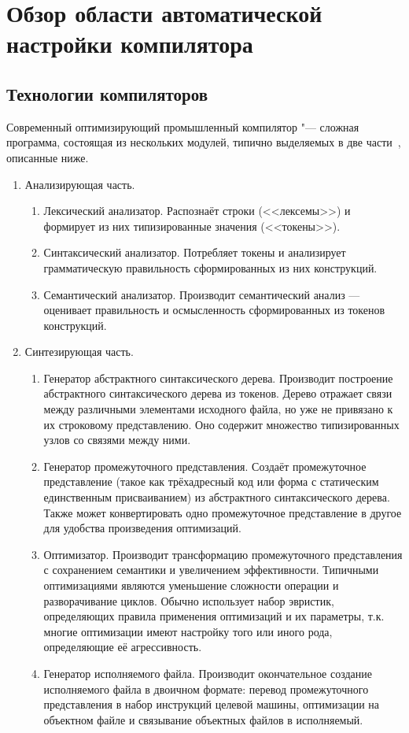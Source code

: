 \section{Обзор области автоматической настройки компилятора}
\subsection{Технологии компиляторов}
Современный оптимизирующий промышленный компилятор "--- сложная программа, состоящая из нескольких модулей, типично выделяемых в две части~\cite{Aho:2006:CPT:1177220}, описанные ниже.
\begin{enumerate}
	\item Анализирующая часть.
	\begin{enumerate}
		\item Лексический анализатор. Распознаёт строки (<<лексемы>>) и формирует из них типизированные значения (<<токены>>).
		\item Синтаксический анализатор. Потребляет токены и анализирует грамматическую правильность сформированных из них конструкций.
		\item Семантический анализатор. Производит семантический анализ --- оценивает правильность и осмысленность сформированных из токенов конструкций.
	\end{enumerate}
	\item Синтезирующая часть.
	\begin{enumerate}
		\item Генератор абстрактного синтаксического дерева. Производит построение абстрактного синтаксического дерева из токенов. Дерево отражает связи между различными элементами исходного файла, но уже не привязано к их строковому представлению. Оно содержит множество типизированных узлов со связями между ними.
		\item Генератор промежуточного представления. Создаёт промежуточное представление (такое как трёхадресный код или форма с статическим единственным присваиванием) из абстрактного синтаксического дерева. Также может конвертировать одно промежуточное представление в другое для удобства произведения оптимизаций.
		\item Оптимизатор. Производит трансформацию промежуточного представления с сохранением семантики и увеличением эффективности. Типичными оптимизациями являются уменьшение сложности операции и разворачивание циклов. Обычно использует набор эвристик, определяющих правила применения оптимизаций и их параметры, т.к. многие оптимизации имеют настройку того или иного рода, определяющие её агрессивность.
		\item Генератор исполняемого файла. Производит окончательное создание исполняемого файла в двоичном формате: перевод промежуточного представления в набор инструкций целевой машины, оптимизации на объектном файле и связывание объектных файлов в исполняемый.
	\end{enumerate}
\end{enumerate}

